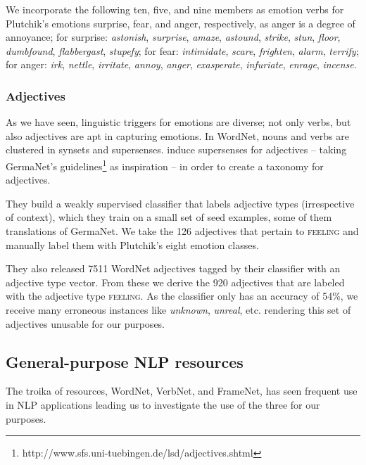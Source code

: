 We incorporate the following ten, five, and nine members as emotion verbs for Plutchik's emotions surprise, fear, and anger, respectively, as anger is a degree of annoyance; for surprise: \textit{astonish}, \textit{surprise}, \textit{amaze}, \textit{astound}, \textit{strike}, \textit{stun}, \textit{floor}, \textit{dumbfound}, \textit{flabbergast}, \textit{stupefy}; for fear: \textit{intimidate}, \textit{scare}, \textit{frighten}, \textit{alarm}, \textit{terrify}; for anger: \textit{irk}, \textit{nettle}, \textit{irritate}, \textit{annoy}, \textit{anger}, \textit{exasperate}, \textit{infuriate}, \textit{enrage}, \textit{incense}.

\subsubsection{Adjectives}

As we have seen, linguistic triggers for emotions are diverse; not only verbs, but also adjectives are apt in capturing emotions. In WordNet, nouns and verbs are clustered in synsets and supersenses. \citeauthor{adjective_supersenses} induce supersenses for adjectives -- taking GermaNet's guidelines\footnote{http://www.sfs.uni-tuebingen.de/lsd/adjectives.shtml} as inspiration -- in order to create a taxonomy for adjectives.

They build a weakly supervised classifier that labels adjective types (irrespective of context), which they train on a small set of seed examples, some of them translations of GermaNet. We take the 126 adjectives that pertain to \textsc{feeling} and manually label them with Plutchik's eight emotion classes.

They also released 7511 WordNet adjectives tagged by their classifier with an adjective type vector. From these we derive the 920 adjectives that are labeled with the adjective type \textsc{feeling}. As the classifier only has an accuracy of 54\%, we receive many erroneous instances like \textit{unknown}, \textit{unreal}, etc. rendering this set of adjectives unusable for our purposes.

\subsection{General-purpose NLP resources}

The troika of resources, WordNet, VerbNet, and FrameNet, has seen frequent use in NLP applications leading us to investigate the use of the three for our purposes.

